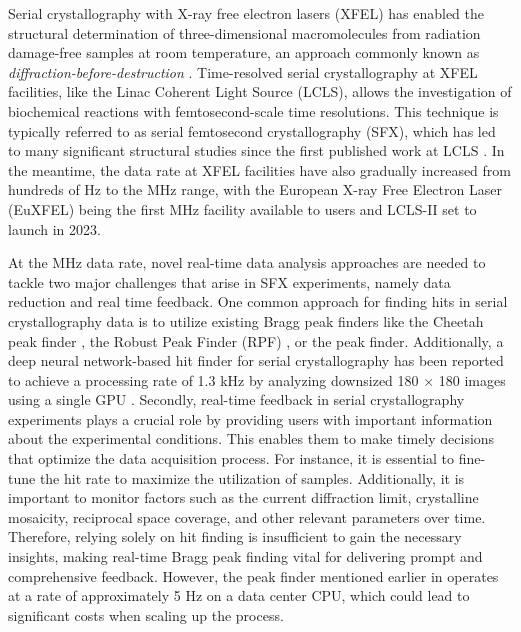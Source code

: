 \documentclass[a4paper]{article}
\begin{document}
Serial crystallography with X-ray free electron lasers (XFEL) has enabled the structural determination of three-dimensional macromolecules from radiation damage-free samples at room temperature, an approach commonly known as \textit{diffraction-before-destruction} \citep{neutzePotentialBiomolecularImaging2000, chapmanFemtosecondDiffractiveImaging2006,chapmanFemtosecondXrayProtein2011}.  Time-resolved serial crystallography at XFEL facilities, like the Linac Coherent Light Source (LCLS), allows the investigation of biochemical reactions with femtosecond-scale time resolutions.  This technique is typically referred to as serial femtosecond crystallography (SFX), which has led to many significant structural studies \citep{kupitzSerialTimeresolvedCrystallography2014, nangoThreedimensionalMovieStructural2016,pandeFemtosecondStructuralDynamics2016a, youngStructurePhotosystemII2016,sugaLightinducedStructuralChanges2017, kernStructuresIntermediatesKok2018,ibrahimUntanglingSequenceEvents2020, sugaTimeresolvedStudiesMetalloproteins2020} since the first published work at LCLS \citep{aquilaTimeresolvedProteinNanocrystallography2012}.  In the meantime, the data rate at XFEL facilities have also gradually increased from hundreds of Hz to the MHz range, with the European X-ray Free Electron Laser (EuXFEL) being the first MHz facility available to users and LCLS-II set to launch in 2023.  

At the MHz data rate, novel real-time data analysis approaches are needed to tackle two major challenges that arise in SFX experiments, namely data reduction and real time feedback.  One common approach for finding hits in serial crystallography data is to utilize existing Bragg peak finders like the Cheetah peak finder \citep{bartyCheetahSoftwareHighthroughput2014}, the Robust Peak Finder (RPF) \citep{hadian-jaziPeakfindingAlgorithmBased2017}, or the \psocake{} \citep{yoonPsocakeGUIMaking2020} peak finder.  Additionally, a deep neural network-based hit finder for serial crystallography has been reported to achieve a processing rate of 1.3 kHz by analyzing downsized 180 $\times$ 180 images using a single GPU \citep{keConvolutionalNeuralNetworkbased2018}.  Secondly, real-time feedback in serial crystallography experiments plays a crucial role by providing users with important information about the experimental conditions.  This enables them to make timely decisions that optimize the data acquisition process. For instance, it is essential to fine-tune the hit rate to maximize the utilization of samples. Additionally, it is important to monitor factors such as the current diffraction limit, crystalline mosaicity, reciprocal space coverage, and other relevant parameters over time. Therefore, relying solely on hit finding is insufficient to gain the necessary insights, making real-time Bragg peak finding vital for delivering prompt and comprehensive feedback. However, the peak finder mentioned earlier in \psocake{} operates at a rate of approximately 5 Hz on a data center CPU, which could lead to significant costs when scaling up the process.
\end{document}
